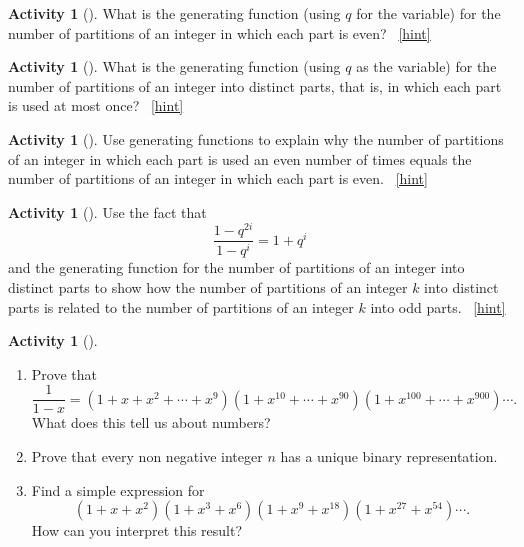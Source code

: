 \documentclass[10pt,]{book}
\theoremstyle{plain}
\theoremstyle{definition}
\theoremstyle{definition}
\theoremstyle{definition}
\newtheorem{activity}[project]{Activity}
\numberwithin{equation}{chapter}
\begin{document}
\begin{activity}[]\label{activity-259}
\hypertarget{p-1186}{}%
What is the generating function (using \(q\) for the variable) for the number of partitions of an integer in which each part is even?%
~\hfill{\tiny\hyperlink{a-259}{[hint]}\hypertarget{q-259}{}}\end{activity}
\begin{activity}[]\label{activity-260}
\hypertarget{p-1189}{}%
What is the generating function (using \(q\) as the variable) for the number of partitions of an integer into distinct parts, that is, in which each part is used at most once?%
~\hfill{\tiny\hyperlink{a-260}{[hint]}\hypertarget{q-260}{}}\end{activity}
\begin{activity}[]\label{activity-261}
\hypertarget{p-1192}{}%
Use generating functions to explain why the number of partitions of an integer in which each part is used an even number of times equals the number of partitions of an integer in which each part is even.%
~\hfill{\tiny\hyperlink{a-261}{[hint]}\hypertarget{q-261}{}}\end{activity}
\begin{activity}[]\label{activity-262}
\hypertarget{p-1195}{}%
Use the fact that%
\begin{equation*}
\frac{1-q^{2i}}{1-q^i}= 1+q^i
\end{equation*}
and the generating function for the number of partitions of an integer into distinct parts to show how the number of partitions of an integer \(k\) into distinct parts is related to the number of partitions of an integer \(k\) into odd parts.%
~\hfill{\tiny\hyperlink{a-262}{[hint]}\hypertarget{q-262}{}}\end{activity}
\begin{activity}[]\label{activity-263}
\leavevmode%
\begin{enumerate}[font=\bfseries,label=(\alph*),ref=\alph*]
\item\label{task-207} \hypertarget{p-1198}{}%
Prove that%
\begin{equation*}
\frac{1}{1-x} = (1 + x + x^2 +\cdots + x^9)(1 + x^{10} + \cdots + x^{90})(1 + x^{100} + \cdots + x^{900})\cdots.
\end{equation*}
What does this tell us about numbers?%
\item\label{task-208} \hypertarget{p-1201}{}%
Prove that every non negative integer \(n\) has a unique binary representation.%
\item\label{task-209} \hypertarget{p-1203}{}%
Find a simple expression for%
\begin{equation*}
(1+x+x^2)(1+x^3+x^6)(1+x^9+x^{18})(1+x^{27}+x^{54})\cdots.
\end{equation*}
How can you interpret this result?%
\end{enumerate}
\end{activity}
\end{document}
